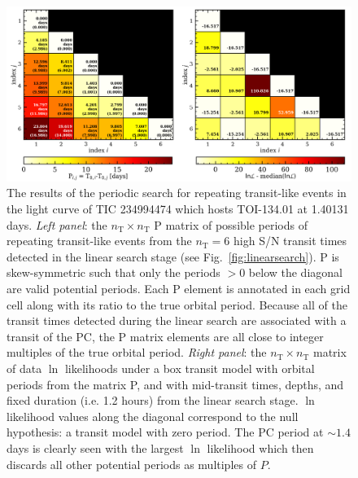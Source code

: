 \begin{figure}
  \centering
  \includegraphics[width=0.8\hsize]{figures/periodicsearch_234994474.png}
  \caption[Results of the periodic search for repeating transit-like events around TIC 234994474.]
      {The results of the periodic search for repeating transit-like events in the
    light curve of TIC 234994474 which hosts TOI-134.01 at 1.40131 days.
    \emph{Left panel}: the $n_{\text{T}} \times n_{\text{T}}$ P matrix of
    possible periods of repeating transit-like events from the $n_{\text{T}}=6$ high S/N transit
    times detected in the linear search stage (see Fig.~\ref{fig:linearsearch}).
    P is skew-symmetric such that only the periods $>0$ below the diagonal are valid potential
    periods. Each P element is annotated in
    each grid cell along with its ratio to the true orbital period.
    Because all of the transit times detected during the linear search
    are associated with a transit of the PC, the P matrix elements are all close to
    integer multiples of the true orbital period. \emph{Right panel}: the
    $n_{\text{T}} \times n_{\text{T}}$ matrix of data $\ln$ likelihoods under a box transit
    model with orbital periods from the matrix P, and with mid-transit times, depths, and
    fixed duration (i.e. 1.2 hours) from the linear search stage.
    $\ln$ likelihood values along the diagonal correspond to the null hypothesis: a transit
    model with zero period. The PC period at $\sim 1.4$ days is clearly seen with the largest
    $\ln$ likelihood which then discards all other potential periods as multiples of $P$.}
  \label{fig:periodicsearch}
\end{figure}

